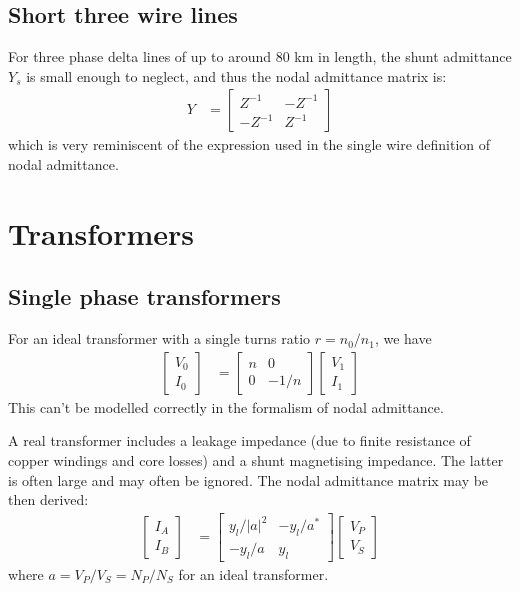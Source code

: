 \documentclass[11pt]{article}
\begin{document}
\subsection{Short three wire lines}
For three phase delta lines of up to around 80 km in length, the shunt admittance $Y_s$ is small enough to neglect, and thus the nodal admittance matrix is:
\begin{align}
	Y &=
	\begin{bmatrix} Z^{-1} & -Z^{-1} \\ -Z^{-1} & Z^{-1} \end{bmatrix}
\end{align}
which is very reminiscent of the expression used in the single wire definition of nodal admittance.
\section{Transformers}
\subsection{Single phase transformers}
For an ideal transformer with a single turns ratio $r = n_0/n_1$, we have
\begin{align}
\begin{bmatrix}V_0 \\ I_0\end{bmatrix} &= \begin{bmatrix}n & 0 \\ 0 & -1/n\end{bmatrix}\begin{bmatrix}V_1 \\ I_1 \end{bmatrix}
\end{align}
This can't be modelled correctly in the formalism of nodal admittance.

A real transformer includes a leakage impedance (due to finite resistance of copper windings and core losses) and a shunt magnetising impedance. The latter is often large and may often be ignored. The nodal admittance matrix may be then derived:
\begin{align}
\begin{bmatrix}I_A \\ I_B \end{bmatrix} &= 
\begin{bmatrix}y_l/|a|^2 & -y_l/a^* \\ -y_l/a & y_l\end{bmatrix}
\begin{bmatrix}V_P \\ V_S \end{bmatrix}
\end{align}
where $a = V_P / V_S = N_P / N_S$ for an ideal transformer.
\end{document}
